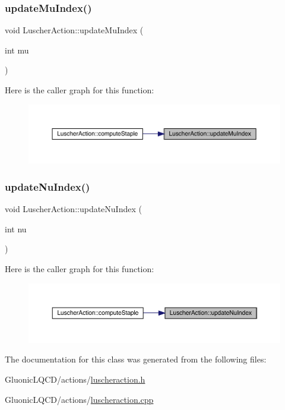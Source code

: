 \subsubsection{\texorpdfstring{updateMuIndex()}{updateMuIndex()}}
{\footnotesize\ttfamily void Luscher\+Action\+::update\+Mu\+Index (\begin{DoxyParamCaption}\item[{int}]{mu }\end{DoxyParamCaption})\hspace{0.3cm}{\ttfamily [inline]}}

Here is the caller graph for this function\+:\nopagebreak
\begin{figure}[H]
\begin{center}
\leavevmode
\includegraphics[width=350pt]{class_luscher_action_a2bfa5f9b8bfb0c4440732000d2281519_icgraph}
\end{center}
\end{figure}
\mbox{\label{class_luscher_action_a6496c97ed38401c0d94855bf940fd6ff}} 
\subsubsection{\texorpdfstring{updateNuIndex()}{updateNuIndex()}}
{\footnotesize\ttfamily void Luscher\+Action\+::update\+Nu\+Index (\begin{DoxyParamCaption}\item[{int}]{nu }\end{DoxyParamCaption})\hspace{0.3cm}{\ttfamily [inline]}}

Here is the caller graph for this function\+:\nopagebreak
\begin{figure}[H]
\begin{center}
\leavevmode
\includegraphics[width=350pt]{class_luscher_action_a6496c97ed38401c0d94855bf940fd6ff_icgraph}
\end{center}
\end{figure}


The documentation for this class was generated from the following files\+:\begin{DoxyCompactItemize}
\item 
Gluonic\+L\+Q\+C\+D/actions/\mbox{\hyperlink{luscheraction_8h}{luscheraction.\+h}}\item 
Gluonic\+L\+Q\+C\+D/actions/\mbox{\hyperlink{luscheraction_8cpp}{luscheraction.\+cpp}}\end{DoxyCompactItemize}
